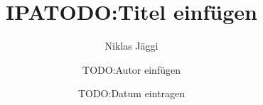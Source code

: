 \documentclass[12pt]{report}
\author{Niklas Jäggi}
\title{IPA}
\title{TODO:Titel einfügen}
\author{TODO:Autor einfügen}
\date{TODO:Datum eintragen}
\begin{document}
{
  \raggedright
  \setlength{\parskip}{\baselineskip}
  
  
  
}
{
  \makeatletter


  \renewcommand\listoftables{%
      \section{\listtablename}%
      \@mkboth{\MakeUppercase\listtablename}%
              {\MakeUppercase\listtablename}%
      \@starttoc{lot}%
  }

  \renewcommand\listoffigures{%
      \section{\listfigurename}%
      \@mkboth{\MakeUppercase\listfigurename}%
          {\MakeUppercase\listfigurename}%
      \@starttoc{lof}%
  }

  \renewcommand\lstlistoflistings{%
      \section{Code Verzeichnis}%
      \@mkboth{Code Verzeichnis}%
          {Code Verzeichnis}%
      \@starttoc{lol}%
  }
  \makeatother
  
  

}
\end{document}
